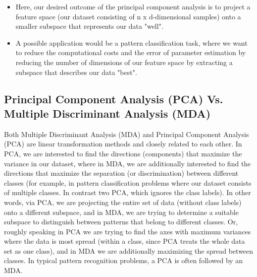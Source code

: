 



\begin{itemize}
\item Here, our desired outcome of the principal component analysis is to project a feature space (our dataset consisting of 
n x d-dimensional samples) onto a smaller subspace that represents our data "well".
\item A possible application would be a pattern 
classification task, where we want to reduce the computational costs and the error of parameter estimation by reducing the 
number of dimensions of our feature space by extracting a subspace that describes our data "best".
\end{itemize}



\subsection*{Principal Component Analysis (PCA) Vs. Multiple Discriminant Analysis (MDA)}

Both Multiple Discriminant Analysis (MDA) and Principal Component Analysis (PCA) are linear transformation methods and closely related to each other. In PCA, we are interested to find the directions (components) that maximize the variance in our dataset, where in MDA, we are additionally interested to find the directions that maximize the separation (or discrimination) between different classes (for example, in pattern classification problems where our dataset consists of multiple classes. In contrast two PCA, which ignores the class labels).
In other words, via PCA, we are projecting the entire set of data (without class labels) onto a different subspace, and in MDA, we are trying to determine a suitable subspace to distinguish between patterns that belong to different classes. Or, roughly speaking in PCA we are trying to find the axes with maximum variances where the data is most spread (within a class, since PCA treats the whole data set as one class), and in MDA we are additionally maximizing the spread between classes. 
In typical pattern recognition problems, a PCA is often followed by an MDA.


